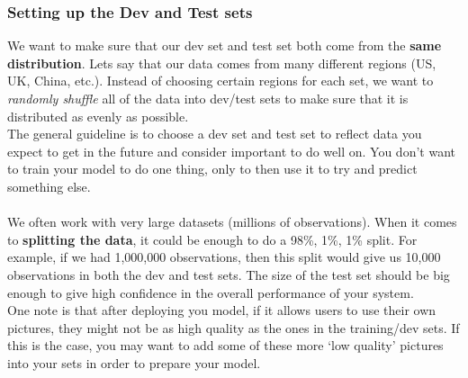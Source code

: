 \documentclass[11pt, a4paper]{article}
\begin{document}
\begin{spacing}{1.1}
	\subsubsection{Setting up the Dev and Test sets}
	We want to make sure that our dev set and test set both come from the \textbf{same distribution}. Lets say that our data comes from many different regions (US, UK, China, etc.). Instead of choosing certain regions for each set, we want to \textit{randomly shuffle} all of the data into dev/test sets to make sure that it is distributed as evenly as possible. \vspace*{1mm} \\
	The general guideline is to choose a dev set and test set to reflect data you expect to get in the future and consider important to do well on. You don't want to train your model to do one thing, only to then use it to try and predict something else. \\~\\
	We often work with very large datasets (millions of observations). When it comes to \textbf{splitting the data}, it could be enough to do a 98\%, 1\%, 1\% split. For example, if we had 1,000,000 observations, then this split would give us 10,000 observations in both the dev and test sets. The size of the test set should be big enough to give high confidence in the overall performance of your system.  \vspace*{2mm} \\
	One note is that after deploying you model, if it allows users to use their own pictures, they might not be as high quality as the ones in the training/dev sets. If this is the case, you may want to add some of these more `low quality' pictures into your sets in order to prepare your model. \newpage


\end{spacing}
\end{document}
